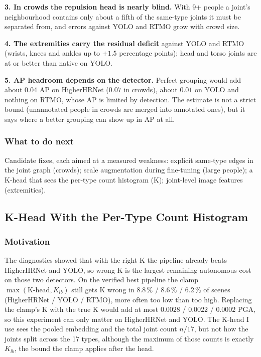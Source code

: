 \textbf{3. In crowds the repulsion head is nearly blind.} With 9+ people a joint's neighbourhood contains only about a fifth of the same-type joints it must be separated from, and errors against YOLO and RTMO grow with crowd size.

\textbf{4. The extremities carry the residual deficit} against YOLO and RTMO (wrists, knees and ankles up to $+1.5$ percentage points); head and torso joints are at or better than native on YOLO.

\textbf{5. AP headroom depends on the detector.} Perfect grouping would add about $0.04$ AP on HigherHRNet ($0.07$ in crowds), about $0.01$ on YOLO and nothing on RTMO, whose AP is limited by detection. The estimate is not a strict bound (unannotated people in crowds are merged into annotated ones), but it says where a better grouping can show up in AP at all.

\subsubsection{What to do next}

Candidate fixes, each aimed at a measured weakness: explicit same-type edges in the joint graph (crowds); scale augmentation during fine-tuning (large people); a K-head that sees the per-type count histogram (K); joint-level image features (extremities).

\subsection{K-Head With the Per-Type Count Histogram}

\subsubsection{Motivation}

The diagnostics showed that with the right K the pipeline already beats HigherHRNet and YOLO, so wrong K is the largest remaining autonomous cost on those two detectors.
On the verified best pipeline the clamp $\max(\text{K-head}, K_{lb})$ still gets K wrong in 8.8\,\% / 8.6\,\% / 6.2\,\% of scenes (HigherHRNet / YOLO / RTMO), more often too low than too high.
Replacing the clamp's K with the true K would add at most $0.0028$ / $0.0022$ / $0.0002$ PGA, so this experiment can only matter on HigherHRNet and YOLO.
The K-head I use sees the pooled embedding and the total joint count $n/17$, but not how the joints split across the 17 types, although the maximum of those counts is exactly $K_{lb}$, the bound the clamp applies after the head.

